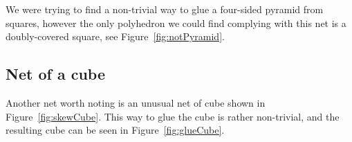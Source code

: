 \documentclass[a4paper,11pt]{article}
\begin{document}
We were trying to find a non-trivial way to glue a four-sided pyramid from squares, however the only polyhedron we could find complying with this net is a doubly-covered square, see Figure~\ref{fig:notPyramid}.



\subsection*{Net of a cube}

Another net worth noting is an unusual net of cube shown in Figure~\ref{fig:skewCube}. This way to glue the cube is rather non-trivial, and the resulting cube can be seen in Figure~\ref{fig:glueCube}.



{}

\end{document}
